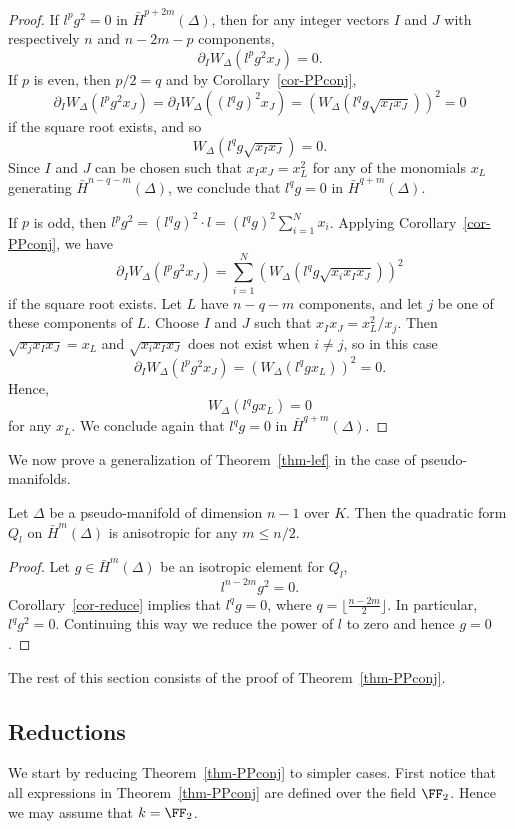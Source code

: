 \begin{proof}
If $l^p g^2 = 0$ in $\bar{H}^{p+2m}(\Delta)$, then for any integer vectors $I$ and $J$ with respectively $n$ and $n-2m-p$ components,
\[ \partial_I W_\Delta(l^p g^2 x_J) = 0. \]
If $p$ is even, then $p/2 = q$ and by Corollary~\ref{cor-PPconj},
\[ \partial_I W_\Delta(l^p g^2 x_J) = \partial_I W_\Delta((l^q g)^2 x_J) = (W_\Delta( l^q g \sqrt{x_I x_J}))^2 = 0 \]
if the square root exists, and so
\[ W_\Delta( l^q g \sqrt{x_I x_J}) = 0. \]
Since $I$ and $J$ can be chosen such that $x_I x_J = x_L^2$  for any of the monomials $x_L$ generating $\bar{H}^{n-q-m}(\Delta)$,  we conclude that $l^q g = 0$ in $\bar{H}^{q+m}(\Delta)$.

If $p$ is odd, then $l^p g^2 = (l^q g)^2 \cdot l = (l^q g)^2 \sum_{i=1}^N x_i$. Applying Corollary~\ref{cor-PPconj}, we have
\[ \partial_I W_\Delta(l^p g^2 x_J) = \sum_{i=1}^N  (W_\Delta(l^q g \sqrt{ x_i x_I x_J} ))^2 \]
if the square root exists. Let $L$ have $n-q-m$ components, and let $j$ be one of these components of $L$. Choose $I$ and $J$ such that $x_I x_J = x_L^2/x_j$. Then $\sqrt{ x_j x_I x_J}  = x_L$ and $\sqrt{ x_i x_I x_J}$ does not exist when $i \neq j$, so in this case
\[ \partial_I W_\Delta(l^p g^2 x_J)
 =   (W_\Delta(l^q g x_L))^2 = 0. \]
Hence,
\[ W_\Delta(l^q g x_L) = 0 \]
for any $x_L$. We conclude again that $l^q g = 0$ in $\bar{H}^{q+m}(\Delta)$.
\end{proof}

We now prove a generalization of Theorem~\ref{thm-lef} in the case of pseudo-manifolds.

\begin{theorem}
Let $\Delta$ be a pseudo-manifold of dimension $n-1$ over $K$. Then the quadratic form $Q_l$ on $\bar{H}^m(\Delta)$ is anisotropic  for any $m\leq n/2$.
\end{theorem}

\begin{proof}
Let $g \in \bar{H}^m(\Delta)$ be an isotropic element for $Q_l$,
\[ l^{n-2m} g^2 = 0.\]
Corollary~\ref{cor-reduce} implies that $l^q g = 0$, where $q = \lfloor \frac{n-2m}{2}\rfloor$. In particular, $l^q g^2 = 0$. Continuing this way we reduce the power of $l$ to zero and hence $g=0$.
\end{proof}



The rest of this section consists of the proof of Theorem~\ref{thm-PPconj}.

\subsection{Reductions} We start by reducing Theorem~\ref{thm-PPconj} to simpler cases. First notice that all expressions in Theorem~\ref{thm-PPconj} are defined over the field $\FF_2$. Hence we may assume that $k=\FF_2$. 

